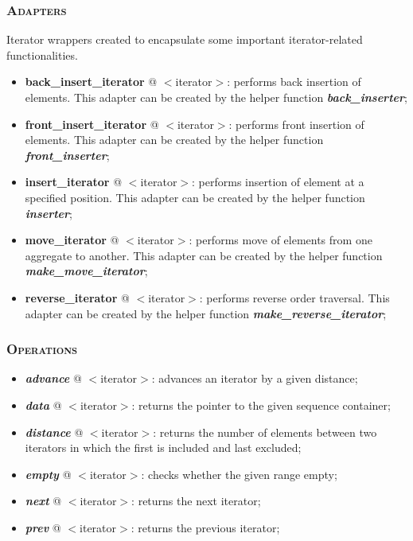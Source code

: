\documentclass[10pt]{article}
\begin{document}
\begin{multicols*}{4}
{\subsubsection*{\textsc{Adapters}} 
\noindent
Iterator wrappers created to encapsulate some important iterator-related functionalities. 
\begin{itemize}[leftmargin=*,topsep=0.25pt]
  \setlength\itemsep{-1.8pt}
	\item \textbf{back\_insert\_iterator} @ $<$iterator$>$: performs back insertion of elements. This adapter can be created by the helper function \emph{\textbf{back\_inserter}};
	\item \textbf{front\_insert\_iterator} @ $<$iterator$>$: performs front insertion of elements. This adapter can be created by the helper function \emph{\textbf{front\_inserter}};
	\item \textbf{insert\_iterator} @ $<$iterator$>$: performs insertion of element at a specified position. This adapter can be created by the helper function \emph{\textbf{inserter}};
	\item \textbf{move\_iterator} @ $<$iterator$>$: performs move of elements from one aggregate to another. This adapter can be created by the helper function \emph{\textbf{make\_move\_iterator}};
	\item \textbf{reverse\_iterator} @ $<$iterator$>$: performs reverse order traversal. This adapter can be created by the helper function \emph{\textbf{make\_reverse\_iterator}};
\end{itemize}

\subsubsection*{\textsc{Operations}} 
\begin{itemize}[leftmargin=*,topsep=0.25pt]
  \setlength\itemsep{-1.8pt}
	\item  \emph{\textbf{advance}} @ $<$iterator$>$: advances an iterator by a given distance;
	\item  \emph{\textbf{data}} @ $<$iterator$>$: returns the pointer to the given sequence container;
	\item  \emph{\textbf{distance}} @ $<$iterator$>$: returns the number of elements between two iterators in which the first is included and last excluded;
	\item  \emph{\textbf{empty}} @ $<$iterator$>$: checks whether the given range empty;
	\item  \emph{\textbf{next}} @ $<$iterator$>$: returns the next iterator;
	\item  \emph{\textbf{prev}} @ $<$iterator$>$: returns the previous iterator;
\end{itemize}
}


\end{multicols*}
\end{document}
